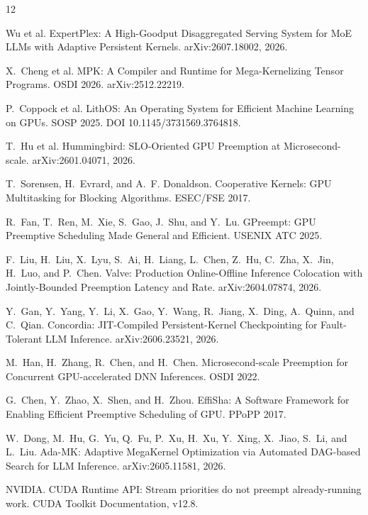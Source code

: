 \documentclass[11pt]{article}
\begin{document}
\begin{thebibliography}{12}

Wu et al.
\newblock ExpertPlex: A High-Goodput Disaggregated Serving System for
MoE LLMs with Adaptive Persistent Kernels.
\newblock arXiv:2607.18002, 2026.

X.~Cheng et al.
\newblock MPK: A Compiler and Runtime for Mega-Kernelizing Tensor
Programs.
\newblock OSDI 2026. arXiv:2512.22219.

P.~Coppock et al.
\newblock LithOS: An Operating System for Efficient Machine Learning
on GPUs.
\newblock SOSP 2025. DOI 10.1145/3731569.3764818.

T.~Hu et al.
\newblock Hummingbird: SLO-Oriented GPU Preemption at
Microsecond-scale.
\newblock arXiv:2601.04071, 2026.

T.~Sorensen, H.~Evrard, and A.~F. Donaldson.
\newblock Cooperative Kernels: GPU Multitasking for Blocking
Algorithms.
\newblock ESEC/FSE 2017.

R.~Fan, T.~Ren, M.~Xie, S.~Gao, J.~Shu, and Y.~Lu.
\newblock GPreempt: GPU Preemptive Scheduling Made General and
Efficient.
\newblock USENIX ATC 2025.

F.~Liu, H.~Liu, X.~Lyu, S.~Ai, H.~Liang, L.~Chen, Z.~Hu, C.~Zha,
X.~Jin, H.~Luo, and P.~Chen.
\newblock Valve: Production Online-Offline Inference Colocation with
Jointly-Bounded Preemption Latency and Rate.
\newblock arXiv:2604.07874, 2026.

Y.~Gan, Y.~Yang, Y.~Li, X.~Gao, Y.~Wang, R.~Jiang, X.~Ding, A.~Quinn,
and C.~Qian.
\newblock Concordia: JIT-Compiled Persistent-Kernel Checkpointing for
Fault-Tolerant LLM Inference.
\newblock arXiv:2606.23521, 2026.

M.~Han, H.~Zhang, R.~Chen, and H.~Chen.
\newblock Microsecond-scale Preemption for Concurrent GPU-accelerated
DNN Inferences.
\newblock OSDI 2022.

G.~Chen, Y.~Zhao, X.~Shen, and H.~Zhou.
\newblock EffiSha: A Software Framework for Enabling Efficient
Preemptive Scheduling of GPU.
\newblock PPoPP 2017.

W.~Dong, M.~Hu, G.~Yu, Q.~Fu, P.~Xu, H.~Xu, Y.~Xing, X.~Jiao, S.~Li,
and L.~Liu.
\newblock Ada-MK: Adaptive MegaKernel Optimization via Automated
DAG-based Search for LLM Inference.
\newblock arXiv:2605.11581, 2026.

NVIDIA.
\newblock CUDA Runtime API: Stream priorities do not preempt
already-running work.
\newblock CUDA Toolkit Documentation, v12.8.

\end{thebibliography}
\end{document}

